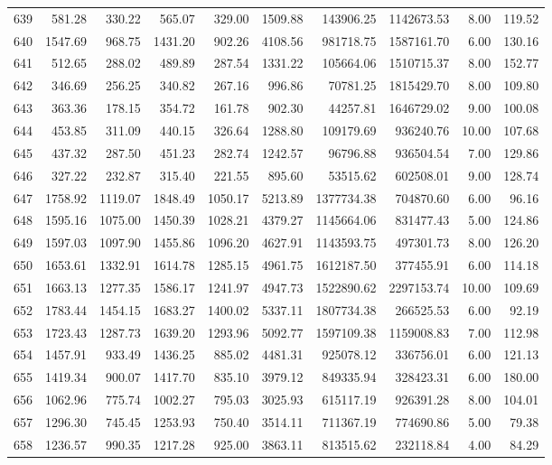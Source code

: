 \begin{tabular}{lrrrrrrrrr}
639 & 581.28 & 330.22 & 565.07 & 329.00 & 1509.88 & 143906.25 & 1142673.53 & 8.00 & 119.52 \\
640 & 1547.69 & 968.75 & 1431.20 & 902.26 & 4108.56 & 981718.75 & 1587161.70 & 6.00 & 130.16 \\
641 & 512.65 & 288.02 & 489.89 & 287.54 & 1331.22 & 105664.06 & 1510715.37 & 8.00 & 152.77 \\
642 & 346.69 & 256.25 & 340.82 & 267.16 & 996.86 & 70781.25 & 1815429.70 & 8.00 & 109.80 \\
643 & 363.36 & 178.15 & 354.72 & 161.78 & 902.30 & 44257.81 & 1646729.02 & 9.00 & 100.08 \\
644 & 453.85 & 311.09 & 440.15 & 326.64 & 1288.80 & 109179.69 & 936240.76 & 10.00 & 107.68 \\
645 & 437.32 & 287.50 & 451.23 & 282.74 & 1242.57 & 96796.88 & 936504.54 & 7.00 & 129.86 \\
646 & 327.22 & 232.87 & 315.40 & 221.55 & 895.60 & 53515.62 & 602508.01 & 9.00 & 128.74 \\
647 & 1758.92 & 1119.07 & 1848.49 & 1050.17 & 5213.89 & 1377734.38 & 704870.60 & 6.00 & 96.16 \\
648 & 1595.16 & 1075.00 & 1450.39 & 1028.21 & 4379.27 & 1145664.06 & 831477.43 & 5.00 & 124.86 \\
649 & 1597.03 & 1097.90 & 1455.86 & 1096.20 & 4627.91 & 1143593.75 & 497301.73 & 8.00 & 126.20 \\
650 & 1653.61 & 1332.91 & 1614.78 & 1285.15 & 4961.75 & 1612187.50 & 377455.91 & 6.00 & 114.18 \\
651 & 1663.13 & 1277.35 & 1586.17 & 1241.97 & 4947.73 & 1522890.62 & 2297153.74 & 10.00 & 109.69 \\
652 & 1783.44 & 1454.15 & 1683.27 & 1400.02 & 5337.11 & 1807734.38 & 266525.53 & 6.00 & 92.19 \\
653 & 1723.43 & 1287.73 & 1639.20 & 1293.96 & 5092.77 & 1597109.38 & 1159008.83 & 7.00 & 112.98 \\
654 & 1457.91 & 933.49 & 1436.25 & 885.02 & 4481.31 & 925078.12 & 336756.01 & 6.00 & 121.13 \\
655 & 1419.34 & 900.07 & 1417.70 & 835.10 & 3979.12 & 849335.94 & 328423.31 & 6.00 & 180.00 \\
656 & 1062.96 & 775.74 & 1002.27 & 795.03 & 3025.93 & 615117.19 & 926391.28 & 8.00 & 104.01 \\
657 & 1296.30 & 745.45 & 1253.93 & 750.40 & 3514.11 & 711367.19 & 774690.86 & 5.00 & 79.38 \\
658 & 1236.57 & 990.35 & 1217.28 & 925.00 & 3863.11 & 813515.62 & 232118.84 & 4.00 & 84.29 \\

\end{tabular}
